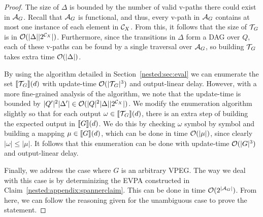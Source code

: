 \begin{proof}
	The size of $\Delta$ is bounded by the number of valid v-paths there could exist in $\mathcal{A}_G$. Recall that $\mathcal{A}_G$ is functional, and thus, every v-path in $\mathcal{A}_G$ contains at most one instance of each element in $\mathcal{C}_{X}$. From this, it follows that the size of $\mathcal{T}\!_G$ is in $\mathcal{O}(\vert\Delta\vert\vert 2^{\mathcal{C}_{X}}\vert)$. Furthermore, since the transitions in $\Delta$ form a DAG over $Q$, each of these v-paths can be found by a single traversal over $\mathcal{A}_G$, so building $\mathcal{T}\!_G$ takes extra time $\mathcal{O}(\vert\Delta\vert)$.
	
	By using the algorithm detailed in Section~\ref{nested:sec:eval} we can enumerate the set $\llbracket \mathcal{T}\!_G \rrbracket(d)$ with update-time $\mathcal{O}(\vert\mathcal{T}\!_G\vert^3)$ and output-linear delay. 
	However, with a more fine-grained analysis of the algorithm, we note that the update-time is bounded by $\vert Q'\vert^2\vert\Delta'\vert\in \mathcal{O}(\vert Q\vert^2\vert\Delta\vert\vert 2^{\mathcal{C}_{X}}\vert)$. We modify the enumeration algorithm slightly so that for each output $\omega\in\llbracket \mathcal{T}\!_G \rrbracket(d)$, there is an extra step of building the expected output in $\llbracket G \rrbracket(d)$. We do this by checking $\omega$ symbol by symbol and building a mapping $\mu\in\llbracket G \rrbracket(d)$, which can be done in time $\mathcal{O}(\vert\mu\vert)$, since clearly $|\omega| \leq |\mu|$. It follows that this enumeration can be done with update-time $\mathcal{O}(\vert G\vert^3)$ and output-linear delay.
	
	Finally, we address the case where $G$ is an arbitrary VPEG. The way we deal with this case is by determinizing the EVPA constructed in Claim~\ref{nested:appendix:spannerclaim}. This can be done in time $\mathcal{O}(2^{\vert \mathcal{A}_G\vert})$. From here, we can follow the reasoning given for the unambiguous case to prove the statement.
\end{proof}
